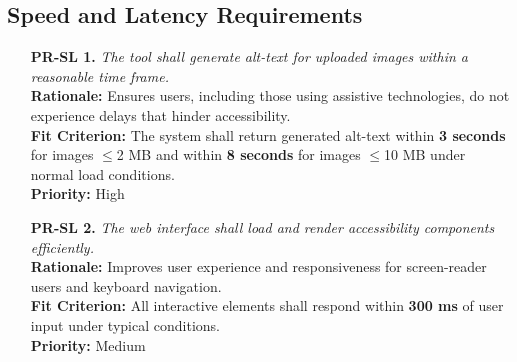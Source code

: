 \documentclass[12pt]{article}
\begin{document}
\subsection{Speed and Latency Requirements}
\begin{itemize}
    \item[\textbf{PR-SL 1.}] \textit{The tool shall generate alt-text for uploaded images within a reasonable time frame.}\\
    \textbf{Rationale:} Ensures users, including those using assistive technologies, do not experience delays that hinder accessibility.\\
    \textbf{Fit Criterion:} The system shall return generated alt-text within \textbf{3 seconds} for images $\leq$2 MB and within \textbf{8 seconds} for images $\leq$10 MB under normal load conditions.\\
    \textbf{Priority:} High

    \item[\textbf{PR-SL 2.}] \textit{The web interface shall load and render accessibility components efficiently.}\\
    \textbf{Rationale:} Improves user experience and responsiveness for screen-reader users and keyboard navigation.\\
    \textbf{Fit Criterion:} All interactive elements shall respond within \textbf{300 ms} of user input under typical conditions.\\
    \textbf{Priority:} Medium
\end{itemize}
\end{document}
